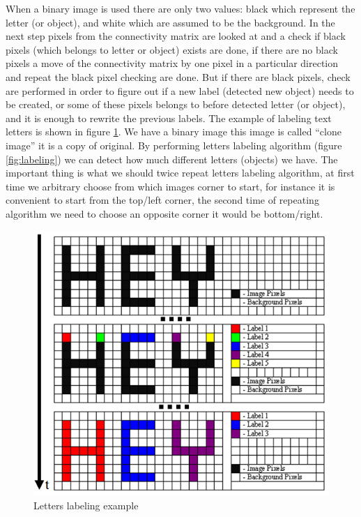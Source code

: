 When a binary image is used there are only two values: black which represent the letter (or object), and white which are assumed to be the background. In the next step pixels from the connectivity matrix are looked at and a check if black pixels (which belongs to letter or object) exists are done, if there are no black pixels a move of the connectivity matrix by one pixel in a particular direction and repeat the black pixel checking are done. But if there are black pixels, check are performed in order to figure out if a new label (detected new object) needs to be created, or some of these pixels belongs to before detected letter (or object), and it is enough to rewrite the previous labels. The example of labeling text letters is shown in figure \ref{fig:labelingexample}. We have a binary image this image is called “clone image” it is a copy of original.  By performing letters labeling algorithm (figure \ref{fig:labeling}) we can detect how much different letters (objects) we have. The important thing is what we should twice repeat letters labeling algorithm, at first time we arbitrary choose from which images corner to start, for instance it  is convenient to start  from the top/left corner, the second time of repeating algorithm we need to choose an opposite corner it would be bottom/right.

\begin{figure}[H]
  \centering
  \includegraphics[scale= 0.6]{source/labelingexample.png}
  \caption{Letters labeling example}
  \label{fig:labelingexample}
\end{figure}

